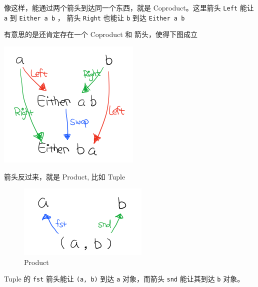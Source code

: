 \documentclass[letterspacing]{tufte-book}
\begin{document}
像这样，能通过两个箭头到达同一个东西，就是 Coproduct。这里箭头 \texttt{Left} 能让 \texttt{a} 到 \texttt{Either a b} ， 箭头 \texttt{Right} 也能让 \texttt{b} 到达 \texttt{Either a b}

有意思的是还肯定存在一个 Coproduct 和 箭头，使得下图成立
\begin{center}
\includegraphics[width=.9\linewidth]{images/p2-coproduct-law.png}
\end{center}

箭头反过来，就是 Product, 比如 Tuple

\begin{figure}[htbp]
\centering
\includegraphics[width=.9\linewidth]{images/p2-product.png}
\caption{Product}
\end{figure}

Tuple 的 \texttt{fst} 箭头能让 \texttt{(a, b)} 到达 \texttt{a} 对象，而箭头 \texttt{snd} 能让其到达 \texttt{b} 对象。
\end{document}
